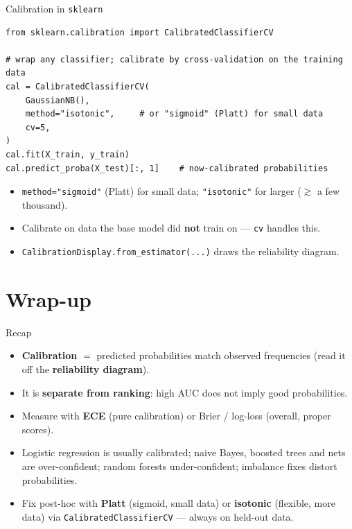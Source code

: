 \documentclass[aspectratio=169]{beamer}
\begin{document}
\begin{frame}[fragile]{Calibration in \texttt{sklearn}}
\begin{lstlisting}
from sklearn.calibration import CalibratedClassifierCV

# wrap any classifier; calibrate by cross-validation on the training data
cal = CalibratedClassifierCV(
    GaussianNB(),
    method="isotonic",     # or "sigmoid" (Platt) for small data
    cv=5,
)
cal.fit(X_train, y_train)
cal.predict_proba(X_test)[:, 1]    # now-calibrated probabilities
\end{lstlisting}
  \vskip 2pt
  \begin{itemize}\small
    \item \texttt{method="sigmoid"} (Platt) for small data; \texttt{"isotonic"} for larger
      ($\gtrsim$ a few thousand).
    \item Calibrate on data the base model did \textbf{not} train on --- \texttt{cv} handles this.
    \item \texttt{CalibrationDisplay.from\_estimator(...)} draws the reliability diagram.
  \end{itemize}
\end{frame}

\section*{Wrap-up}

\begin{frame}{Recap}
  \begin{itemize}\small
    \item \textbf{Calibration} $=$ predicted probabilities match observed frequencies (read it
      off the \textbf{reliability diagram}).
    \item It is \textbf{separate from ranking}: high AUC does not imply good probabilities.
    \item Measure with \textbf{ECE} (pure calibration) or Brier / log-loss (overall, proper scores).
    \item Logistic regression is usually calibrated; naive Bayes, boosted trees and nets are
      over-confident; random forests under-confident; imbalance fixes distort probabilities.
    \item Fix post-hoc with \textbf{Platt} (sigmoid, small data) or \textbf{isotonic} (flexible,
      more data) via \texttt{CalibratedClassifierCV} --- always on held-out data.
  \end{itemize}
  \vfill
\end{frame}
\end{document}

